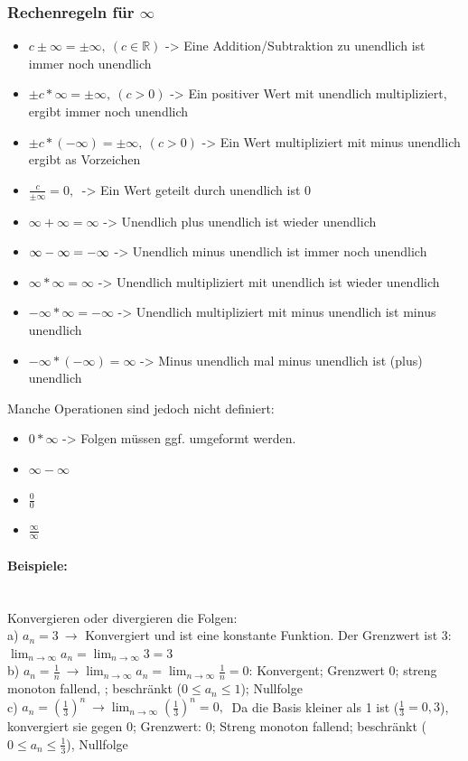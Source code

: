 \documentclass{article}
\newcommand{\paragraphlb}[1]{\paragraph{#1}\mbox{}\\}
\newcommand{\R}{\mathbb{R}}
\begin{document}
	\subsubsection{Rechenregeln für \texorpdfstring{$\infty$}{}}
	\begin{itemize}
		\item{$c\pm\infty=\pm\infty,\ (c\in\R)$ -> Eine Addition/Subtraktion zu unendlich ist immer noch unendlich}
		\item{$\pm c*\infty=\pm\infty,\ (c>0)$ -> Ein positiver Wert mit unendlich multipliziert, ergibt immer noch unendlich}
		\item{$\pm c*(-\infty)=\pm\infty,\ (c>0)$ -> Ein Wert multipliziert mit minus unendlich ergibt as Vorzeichen}
		\item{$\frac{c}{\pm\infty}=0,\ $ -> Ein Wert geteilt durch unendlich ist 0}
		\item{$\infty + \infty=\infty$ -> Unendlich plus unendlich ist wieder unendlich}
		\item{$\-\infty-\infty = -\infty$ -> Unendlich minus unendlich ist immer noch unendlich}
		\item{$\infty*\infty=\infty$ -> Unendlich multipliziert mit unendlich ist wieder unendlich}
		\item{$-\infty*\infty=-\infty$ -> Unendlich multipliziert mit minus unendlich ist minus unendlich}
		\item{$-\infty*(-\infty)=\infty$ -> Minus unendlich mal minus unendlich ist (plus) unendlich}
	\end{itemize}
	Manche Operationen sind jedoch nicht definiert:
	\begin{itemize}
		\item{$0*\infty$ -> Folgen müssen ggf. umgeformt werden.}
		\item{$\infty-\infty$}
		\item{$\frac{0}{0}$}
		\item{$\frac{\infty}{\infty}$}
	\end{itemize}
	\paragraphlb{Beispiele:}
	Konvergieren oder divergieren die Folgen: \\
	a) $a_n=3\ \to$ Konvergiert und ist eine konstante Funktion. Der Grenzwert ist 3: $\lim_{n\to\infty}a_n=\lim_{n\to\infty}3=3$ \\
	b) $a_n=\frac{1}{n}\ \to \lim_{n\to\infty}a_n=\lim_{n\to\infty}\frac{1}{n}=0$: Konvergent; Grenzwert 0; streng monoton fallend,
	; beschränkt ($0\leq a_n\leq 1$); Nullfolge \\
	c) $a_n=(\frac{1}{3})^n\ \to \lim_{n\to\infty}(\frac{1}{3})^n=0,\ $ Da die Basis kleiner als 1 ist ($\frac{1}{3}=0,3$), konvergiert sie gegen 0; Grenzwert: 0; Streng monoton fallend; beschränkt ($0\leq a_n\leq \frac{1}{3}$), Nullfolge \\
\end{document}
